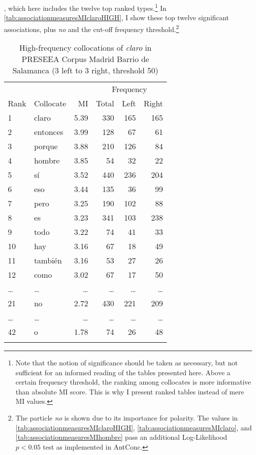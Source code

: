 \citep[206]{Desagulier.2017}, which here includes the twelve top ranked types.\footnote{Note that the notion of significance should be taken as necessary, but not sufficient for an informed reading of the tables presented here. Above a certain frequency threshold, the ranking among collocates is more informative than absolute \ac{MI} score. This is why I present ranked tables instead of mere \ac{MI} values.} In \autoref{tab:associationmeasuresMIclaroHIGH}, I show these top twelve significant associations, plus \textit{no} and the cut-off frequency threshold.\footnote{The particle \textit{no} is shown due to its importance for polarity. The values in \autoref{tab:associationmeasuresMIclaroHIGH}, \autoref{tab:associationmeasuresMIclaro}, and \autoref{tab:associationmeasuresMIhombre} pass an additional Log-Likelihood $p<0.05$ test as implemented in AntConc.}

\begin{table}
	\begin{tabular}{ll *4{r}}
		\lsptoprule
		 &  &  & \multicolumn{3}{c}{Frequency} \\\cmidrule(lr){4-6}
		  Rank   &   Collocate        &  MI  & Total  & Left& Right\\\midrule
		1 & claro & 5.39 & 330 & 165 & 165 \\
		2 & entonces & 3.99 & 128 & 67 & 61 \\
		3 & porque & 3.88 & 210 & 126 & 84 \\
		4 & hombre & 3.85 & 54 & 32 & 22 \\
		5 & sí & 3.52 & 440 & 236 & 204 \\
		6 & eso & 3.44 & 135 & 36 & 99 \\
		7 & pero & 3.25 & 190 & 102 & 88 \\
		8 & es & 3.23 & 341 & 103 & 238 \\
		9 & todo & 3.22 & 74 & 41 & 33 \\
		10 & hay & 3.16 & 67 & 18 & 49 \\
		11 & también & 3.16 & 53 & 27 & 26 \\
		12 & como & 3.02 & 67 & 17 & 50 \\
		\ldots & \ldots & \ldots & \ldots & \ldots & \ldots \\
		21 & no & 2.72 & 430 & 221 & 209 \\
		\ldots & \ldots & \ldots & \ldots & \ldots & \ldots \\
		42 & o & 1.78 & 74 & 26 & 48 \\
		\lspbottomrule 
	\end{tabular}
	\caption{High-frequency collocations of \textit{claro} in PRESEEA Corpus Madrid Barrio de Salamanca (3 left to 3 right, threshold 50)}
	\label{tab:associationmeasuresMIclaroHIGH}
\end{table}

